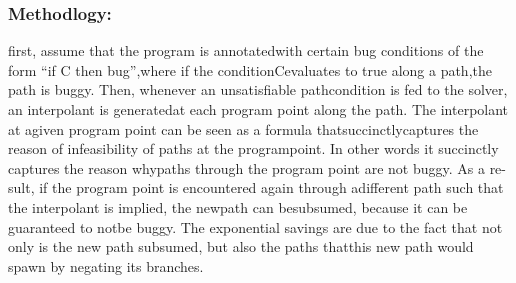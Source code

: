 \documentclass[	runningheads,
				a4paper]{llncs}
\begin{document}
\subsubsection{Methodlogy:}
first,  assume  that  the  program  is  annotatedwith  certain  bug  conditions  of  the  form “if C then bug”,where  if  the  conditionCevaluates  to  true  along  a  path,the  path  is  buggy.   Then,  whenever  an  unsatisfiable  pathcondition  is  fed  to  the  solver,  an  interpolant  is  generatedat each program point along the path.  The interpolant at agiven program point can be seen as a formula thatsuccinctlycaptures the reason of infeasibility of paths at the programpoint.  In other words it succinctly captures the reason whypaths through the program point are not buggy.  As a re-sult,  if  the  program  point  is  encountered  again  through  adifferent path such that the interpolant is implied, the newpath can besubsumed, because it can be guaranteed to notbe buggy. The exponential savings are due to the fact that not only is the new path subsumed, but also the paths thatthis new path would spawn by negating its branches.
\end{document}

